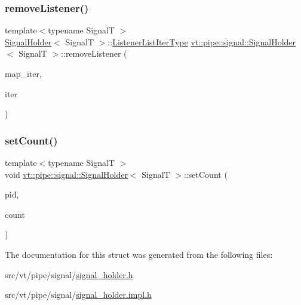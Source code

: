 \mbox{\label{structvt_1_1pipe_1_1signal_1_1_signal_holder_a08a8e0ba7a1eac7df48561112f5859ab}} 
\subsubsection{\texorpdfstring{remove\+Listener()}{removeListener()}\hspace{0.1cm}{\footnotesize\ttfamily [2/2]}}
{\footnotesize\ttfamily template$<$typename SignalT $>$ \\
\hyperlink{structvt_1_1pipe_1_1signal_1_1_signal_holder}{Signal\+Holder}$<$ SignalT $>$\+::\hyperlink{structvt_1_1pipe_1_1signal_1_1_signal_holder_af0d3ccf4a8700979f414a0485cf41df5}{Listener\+List\+Iter\+Type} \hyperlink{structvt_1_1pipe_1_1signal_1_1_signal_holder}{vt\+::pipe\+::signal\+::\+Signal\+Holder}$<$ SignalT $>$\+::remove\+Listener (\begin{DoxyParamCaption}\item[{\hyperlink{structvt_1_1pipe_1_1signal_1_1_signal_holder_a7f6eed09a10f9b4f679c99ae85983879}{Listener\+Map\+Iter\+Type}}]{map\+\_\+iter,  }\item[{\hyperlink{structvt_1_1pipe_1_1signal_1_1_signal_holder_af0d3ccf4a8700979f414a0485cf41df5}{Listener\+List\+Iter\+Type}}]{iter }\end{DoxyParamCaption})}

\mbox{\label{structvt_1_1pipe_1_1signal_1_1_signal_holder_aa15cf43c4602a9d866f8060746696a45}} 
\subsubsection{\texorpdfstring{set\+Count()}{setCount()}}
{\footnotesize\ttfamily template$<$typename SignalT $>$ \\
void \hyperlink{structvt_1_1pipe_1_1signal_1_1_signal_holder}{vt\+::pipe\+::signal\+::\+Signal\+Holder}$<$ SignalT $>$\+::set\+Count (\begin{DoxyParamCaption}\item[{\hyperlink{namespacevt_ac9852acda74d1896f48f406cd72c7bd3}{Pipe\+Type} const \&}]{pid,  }\item[{\hyperlink{structvt_1_1pipe_1_1signal_1_1_signal_holder_aced54515f402b63f6dea174e5b027c81}{Sig\+Count\+Type} const \&}]{count }\end{DoxyParamCaption})}



The documentation for this struct was generated from the following files\+:\begin{DoxyCompactItemize}
\item 
src/vt/pipe/signal/\hyperlink{signal__holder_8h}{signal\+\_\+holder.\+h}\item 
src/vt/pipe/signal/\hyperlink{signal__holder_8impl_8h}{signal\+\_\+holder.\+impl.\+h}\end{DoxyCompactItemize}
